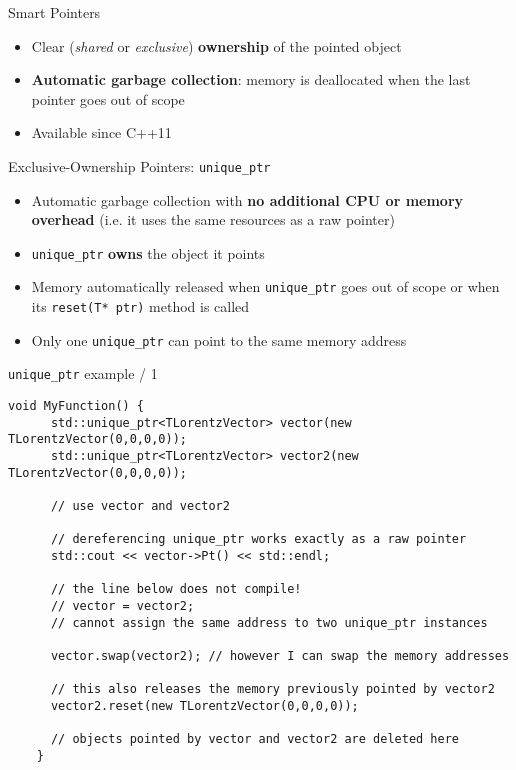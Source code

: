 \documentclass[xcolor={usenames,dvipsnames}]{beamer}
\begin{document}
\begin{frame}[fragile]{Smart Pointers}
\linespread{1.5}
\begin{itemize}
\item Clear (\emph{shared} or \emph{exclusive}) \textbf{ownership} of the pointed object
\pause
\item \alert{\textbf{Automatic garbage collection}}: memory is deallocated when the last pointer goes out of scope
\pause
\item Available since C++11
\end{itemize}
\end{frame}

\begin{frame}[fragile]{Exclusive-Ownership Pointers: \texttt{unique\_ptr}}
\linespread{1.5}
\begin{itemize}
\item Automatic garbage collection with \textbf{\alert{no additional CPU or memory overhead}} (i.e. it uses the same resources as a raw pointer)
\pause
\item \texttt{unique\_ptr} \textbf{owns} the object it points
\pause
\item Memory automatically released when \texttt{unique\_ptr} goes out of scope or when its \texttt{reset(T* ptr)} method is called
\pause
\item Only one \texttt{unique\_ptr} can point to the same memory address
\end{itemize}
\end{frame}

\begin{frame}[fragile]{\texttt{unique\_ptr} example / 1}
\scriptsize
\begin{lstlisting}[style=base, gobble=4]
    void MyFunction() {
      std::unique_ptr<TLorentzVector> vector(new TLorentzVector(0,0,0,0));
      std::unique_ptr<TLorentzVector> vector2(new TLorentzVector(0,0,0,0));
  
      // use vector and vector2
  
      // dereferencing unique_ptr works exactly as a raw pointer
      std::cout << vector->Pt() << std::endl;
  
      // the line below does not compile!
      // vector = vector2;
      // cannot assign the same address to two unique_ptr instances
  
      vector.swap(vector2); // however I can swap the memory addresses
  
      // this also releases the memory previously pointed by vector2
      vector2.reset(new TLorentzVector(0,0,0,0)); 
  
      // objects pointed by vector and vector2 are deleted here
    }
\end{lstlisting}
\end{frame}
\end{document}
